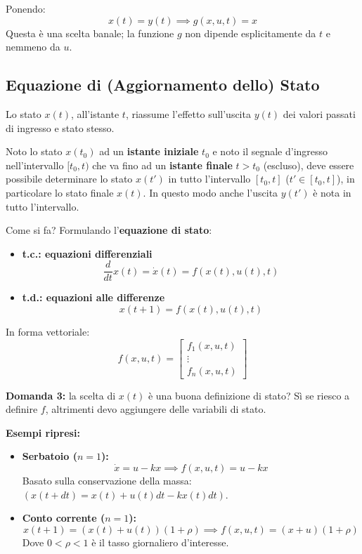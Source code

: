 \documentclass[11pt,a4paper]{article}
\begin{document}
Ponendo:
$$x(t) = y(t) \implies g(x, u, t) = x$$
Questa è una scelta banale; la funzione $g$ non dipende esplicitamente da $t$ e nemmeno da $u$.

\subsection{Equazione di (Aggiornamento dello) Stato}
Lo stato $x(t)$, all'istante $t$, riassume l'effetto sull'uscita $y(t)$ dei valori passati di ingresso e stato stesso.

Noto lo stato $x(t_0)$ ad un \textbf{istante iniziale} $t_0$ e noto il segnale d'ingresso nell'intervallo $[t_0, t)$ che va fino ad un \textbf{istante finale} $t > t_0$ (escluso), deve essere possibile determinare lo stato $x(t')$ in tutto l'intervallo $[t_0, t]$ ($t' \in [t_0, t]$), in particolare lo stato finale $x(t)$. In questo modo anche l'uscita $y(t')$ è nota in tutto l'intervallo.

Come si fa? Formulando l'\textbf{equazione di stato}:

\begin{itemize}
    \item \textbf{t.c.: equazioni differenziali}
    $$\frac{d}{dt}x(t) = \dot{x}(t) = f(x(t), u(t), t)$$
    
    \item \textbf{t.d.: equazioni alle differenze}
    $$x(t+1) = f(x(t), u(t), t)$$
\end{itemize}

In forma vettoriale:
$$f(x, u, t) = \begin{bmatrix} f_1(x,u,t) \\ \vdots \\ f_n(x,u,t) \end{bmatrix}$$

\textbf{Domanda 3:} la scelta di $x(t)$ è una buona definizione di stato?
Sì se riesco a definire $f$, altrimenti devo aggiungere delle variabili di stato.

\textbf{Esempi ripresi:}
\begin{itemize}
    \item \textbf{Serbatoio ($n=1$):}
    $$\dot{x} = u - kx \implies f(x, u, t) = u - kx$$
    Basato sulla conservazione della massa: $(x(t+dt) = x(t) + u(t)dt - kx(t)dt)$.
    
    \item \textbf{Conto corrente ($n=1$):}
    $$x(t+1) = (x(t) + u(t))(1+\rho) \implies f(x, u, t) = (x+u)(1+\rho)$$
    Dove $0 < \rho < 1$ è il tasso giornaliero d'interesse.
\end{itemize}
\end{document}
